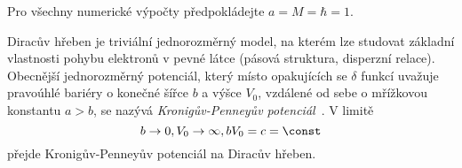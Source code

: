 Pro všechny numerické výpočty předpokládejte $a=M=\hbar=1$.

\begin{note}
    Diracův hřeben je triviální jednorozměrný model, na kterém lze studovat základní vlastnosti pohybu elektronů v pevné látce (pásová struktura, disperzní relace).
    Obecnější jednorozměrný potenciál, který místo opakujících se $\delta$ funkcí uvažuje pravoúhlé bariéry o konečné šířce $b$ a výšce $V_{0}$, vzdálené od sebe o mřížkovou konstantu $a>b$, se nazývá \emph{Kronigův-Penneyův potenciál}~\cite{Kronig1931}.
    V limitě
    \begin{equation}
        b\rightarrow0,V_{0}\rightarrow\infty,bV_{0}=c=\const
    \end{equation}
    přejde Kronigův-Penneyův potenciál na Diracův hřeben.
\end{note}

